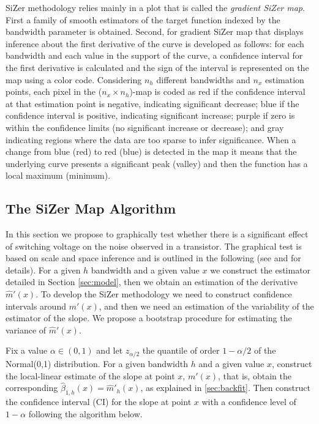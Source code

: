 \documentclass[sn-mathphys]{sn-jnl}%
\theoremstyle{thmstyleone}%
\theoremstyle{thmstyletwo}%
\theoremstyle{thmstylethree}%
\begin{document}
SiZer methodology relies mainly in a plot that is called the \textit{gradient SiZer map}. First a family of smooth estimators of the target function indexed by the bandwidth parameter is obtained. Second, for gradient SiZer map that displays inference about the first derivative of the curve is developed as follows: for each bandwidth and each value in the support of the curve, a confidence interval for the first derivative is calculated and the sign of the interval is represented on the map using a color code. Considering $n_h$ different bandwidths and $n_x$ estimation points, each pixel in the ($n_x \times n_h$)-map is coded as red if the confidence interval at that estimation point is negative, indicating significant decrease; blue if the confidence interval is positive, indicating
significant increase; purple if zero is within the confidence limits (no significant increase or decrease); and gray indicating regions where the data are too sparse to infer significance.  When a change from blue (red) to red (blue) is detected in the map it means that the underlying curve presents a significant peak (valley) and then the function has a local maximum (minimum).



\subsection{The SiZer Map Algorithm}
In this section we propose to graphically test whether there is a significant effect of switching voltage on the noise observed in a transistor. The graphical test is based on scale and space inference and is outlined in the following (see \cite{CM1999} and  \cite{GNR2020} for details). For a given $h$ bandwidth and a given value $x$ we construct the estimator detailed in Section \ref{sec:model}, then we obtain an estimation of the derivative $\widehat{m}'(x)$. To develop the SiZer methodology we need to construct confidence intervals around $m'(x)$, and then we need an estimation of the variability of the estimator of the slope. We propose a bootstrap procedure for estimating the variance of $\widehat{m}'(x)$. \

Fix a value $\alpha \in (0,1)$ and let $z_{\alpha/2}$ the quantile of order $1-\alpha/2$ of the Normal(0,1) distribution. For a given bandwidth $h$ and a given value $x$, construct the local-linear estimate of the slope at point $x$, $m'(x)$, that is, obtain the corresponding $\widehat{\beta}_{1,h}(x)=\widehat{m}'_h(x)$, as explained in \ref{sec:backfit}. Then construct the confidence interval (CI) for the slope at point $x$ with a confidence level of $1-\alpha$ following the algorithm below.
\end{document}
